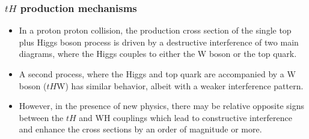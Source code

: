 \documentclass[11pt]{beamer}
\begin{document}
\begin{frame}
\frametitle{$tH$ production mechanisms}
\begin{itemize}
\item In a proton proton collision, the production cross section of the single top plus Higgs boson process is driven by a
destructive interference of two main diagrams, where the Higgs couples to either
the W boson or the top quark. 
\item  A second process, where the Higgs and top quark
are accompanied by a W boson ($tH$W) has similar behavior, albeit with a weaker interference
pattern.
\item However, in the presence of new physics, there may be relative opposite signs between the $tH$
and WH couplings which lead to constructive interference and enhance the cross sections by
an order of magnitude or more.
\end{itemize}
\end{frame}
\end{document}

